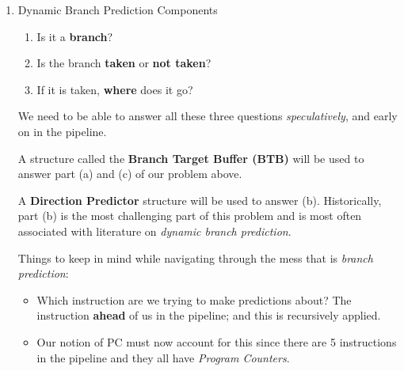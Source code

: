 \documentclass[12pt]{article}
\newenvironment{QandA}{\begin{enumerate}[label=\bfseries\alph*.]\bfseries}
                      {\end{enumerate}}
\newenvironment{answered}{\par\quad\normalfont}{}
\begin{document}
\begin{QandA}
\begin{answered}
    \textit{Dynamic Branch Prediction Performance:}

    Instructions are Branch: 20\%, Load: 20\%, Store: 10\%, Other: 50\%. 75\% of \textit{Branch Instructions} are taken. \textbf{Branch targets are predicted with 95\% accuracy}. What is the CPI?
    
    \begin{equation*}
        CPI = 1 + 20\% \times 5\% \times \textbf{2}
    \end{equation*}
    \begin{equation*}
        CPI = 1 + 0.20 \times 0.05 \times \textbf{2} = 1.02
    \end{equation*}

    In this case, \textit{Branch Instructions} will cause a 2\% slow-down. This is significantly better than the previous na\"ive approach. 
\end{answered}

\item Dynamic Branch Prediction Components
\vspace{-0.85cm}
\begin{answered}
\begin{enumerate}
    \item Is it a \textbf{branch}?
    \item Is the branch \textbf{taken} or \textbf{not taken}?
    \item If it is taken, \textbf{where} does it go?
\end{enumerate}
We need to be able to answer all these three questions \textit{speculatively}, and early on in the pipeline.

A structure called the \textbf{Branch Target Buffer (BTB)} will be used to answer part (a) and (c) of our problem above. 

A \textbf{Direction Predictor} structure will be used to answer (b). Historically, part (b) is the most challenging part of this problem and is most often associated with literature on \textit{dynamic branch prediction}.

Things to keep in mind while navigating through the mess that is \textit{branch prediction}:
\begin{itemize}
    \item Which instruction are we trying to make predictions about? The instruction \textbf{ahead} of us in the pipeline; and this is recursively applied. 
    \item Our notion of PC must now account for this since there are 5 instructions in the pipeline and they all have \textit{Program Counters}. 
\end{itemize}


\end{answered}
\end{QandA}
\end{document}
